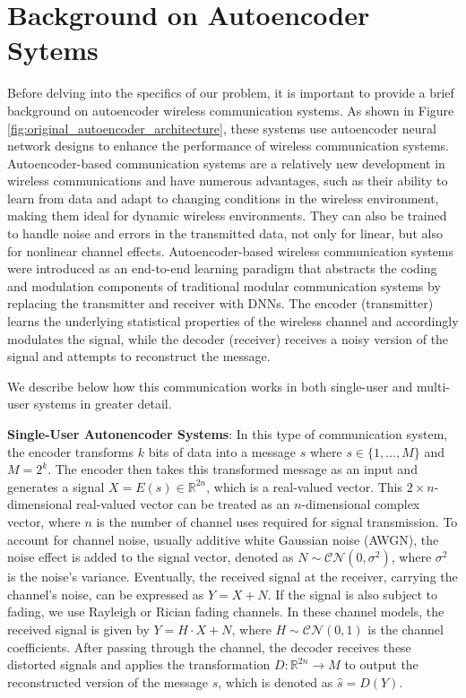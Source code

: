 \section{Background on Autoencoder Sytems}

Before delving into the specifics of our problem, it is important to provide a brief background on autoencoder wireless communication systems. As shown in Figure \ref{fig:original_autoencoder_architecture}, these systems use autoencoder neural network designs \cite{baldi2012autoencoders} to enhance the performance of wireless communication systems. Autoencoder-based communication systems are a relatively new development in wireless communications and have numerous advantages, such as their ability to learn from data and adapt to changing conditions in the wireless environment, making them ideal for dynamic wireless environments. They can also be trained to handle noise and errors in the transmitted data, not only for linear, but also for nonlinear channel effects. Autoencoder-based wireless communication systems were introduced as an end-to-end learning paradigm that abstracts the coding and modulation components of traditional modular communication systems by replacing the transmitter and receiver with DNNs. The encoder (transmitter) learns the underlying statistical properties of the wireless channel and accordingly modulates the signal, while the decoder (receiver) receives a noisy version of the signal and attempts to reconstruct the message.

We describe below how this communication works in both single-user and multi-user systems in greater detail.

\textbf{Single-User Autonencoder Systems}: In this type of communication system, the encoder transforms \(k\) bits of data into a message \(s\) where \(s \in \{1,...,M\}\) and \(M = 2^k\). The encoder then takes this transformed message as an input and generates a signal \(X = E(s) \in \mathbb{R}^{2n}\), which is a real-valued vector. This \(2 \times n\)-dimensional real-valued vector can be treated as an \(n\)-dimensional complex vector, where \(n\) is the number of channel uses required for signal transmission. To account for channel noise, usually additive white Gaussian noise (AWGN), the noise effect is added to the signal vector, denoted as \(N \sim \mathcal{CN}(0, \sigma^2)\), where \(\sigma^2\) is the noise's variance. Eventually, the received signal at the receiver, carrying the channel's noise, can be expressed as \(Y = X + N\). If the signal is also subject to fading, we use Rayleigh or Rician fading channels. In these channel models, the received signal is given by \(Y = H \cdot X + N\), where \(H \sim \mathcal{CN}(0, 1)\) is the channel coefficients. After passing through the channel, the decoder receives these distorted signals and applies the transformation \(D: \mathbb{R}^{2n} \rightarrow M \) to output the reconstructed version of the message \(s\), which is  denoted as \(\hat{s} = D(Y)\).

